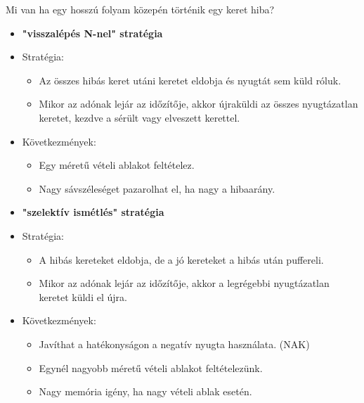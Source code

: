 \documentclass[12pt]{article}
\begin{document}
    \noindent Mi van ha egy hosszú folyam közepén történik egy keret hiba?
    \begin{itemize}[leftmargin=7.5mm]
        \renewcommand{\labelitemi}{$\vcenter{\hbox{\tiny$\bullet$}}$}
    	\item \textbf{\small "visszalépés N-nel" stratégia}
        \item[] Stratégia:
        \begin{itemize}[leftmargin=7.5mm]
            \renewcommand{\labelitemii}{$\vcenter{\hbox{\tiny$\circ$}}$}
            \item Az összes hibás keret utáni keretet eldobja és nyugtát sem küld róluk.
            \item Mikor az adónak lejár az időzítője, akkor újraküldi az összes nyugtázatlan keretet, kezdve a sérült vagy elveszett kerettel.
        \end{itemize}
        \item[] Következmények:
        \begin{itemize}[leftmargin=7.5mm]
            \renewcommand{\labelitemii}{$\vcenter{\hbox{\tiny$\circ$}}$}
            \item Egy méretű vételi ablakot feltételez.
            \item Nagy sávszéleséget pazarolhat el, ha nagy a hibaarány.
        \end{itemize}
\newpage        
    	\item \textbf{\small "szelektív ismétlés" stratégia}
        \item[] Stratégia:
        \begin{itemize}[leftmargin=7.5mm]
            \renewcommand{\labelitemii}{$\vcenter{\hbox{\tiny$\circ$}}$}
            \item A hibás kereteket eldobja, de a jó kereteket a hibás után puffereli.
            \item Mikor az adónak lejár az időzítője, akkor a legrégebbi nyugtázatlan keretet küldi el újra.
        \end{itemize}
        \item[] Következmények:
        \begin{itemize}[leftmargin=7.5mm]
            \renewcommand{\labelitemii}{$\vcenter{\hbox{\tiny$\circ$}}$}
            \item Javíthat a hatékonyságon a negatív nyugta használata. (NAK)
            \item Egynél nagyobb méretű vételi ablakot feltételezünk.
            \item Nagy memória igény, ha nagy vételi ablak esetén.\\\\
        \end{itemize}
    \end{itemize}
\end{document}
